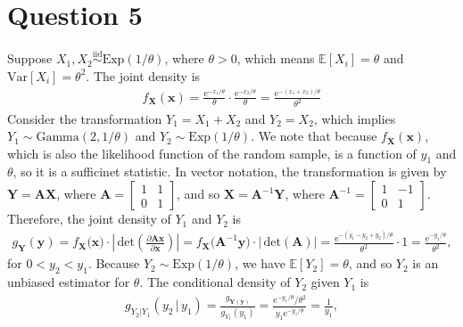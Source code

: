 \documentclass[10pt]{article}
\begin{document}
\section{Question 5} \noindent
Suppose \(X_1, X_2 \overset{\mathrm{iid}}{\sim} \mathrm{Exp}(1/\theta)\), where \(\theta > 0\), which means \(\mathbb{E}[X_i] = \theta\) and \(\mathrm{Var}[X_i] = \theta^2\). 
The joint density is 
\begin{align*}
    f_{\bm{X}}(\mathbf{x}) 
    = \frac{\mathrm{e}^{-x_1/\theta}}{\theta} \cdot \frac{\mathrm{e}^{-x_2/\theta}}{\theta}
    = \frac{\mathrm{e}^{-(x_1 + x_2)/\theta}}{\theta^2}
\end{align*}
Consider the transformation \(Y_1 = X_1 + X_2\) and \(Y_2 = X_2\), which implies \(Y_1 \sim \mathrm{Gamma}(2, 1/\theta)\) and \(Y_2 \sim \mathrm{Exp}(1/\theta)\).
We note that because \(f_{\bm{X}}(\mathbf{x})\), which is also the likelihood function of the random sample, is a function of \(y_1\) and \(\theta\), so it is
a sufficinet statistic. 
In vector notation, the transformation is given by \(\bm{Y} = \mathbf{A} \bm{X}\), where \(\mathbf{A} = \left[ \begin{smallmatrix}
    1 & 1 \\ 0 & 1
\end{smallmatrix} \right]\), and so \(\bm{X} = \mathbf{A}^{-1}\bm{Y}\), where \(\mathbf{A}^{-1} = \left[ \begin{smallmatrix}
    1 & -1 \\ 0 & 1
\end{smallmatrix} \right]\). Therefore, the joint density of \(Y_1\) and \(Y_2\) is 
\begin{align*}
    g_{\bm{Y}}(\mathbf{y}) 
    = f_{\bm{X}} \big( \mathbf{x} \big) \cdot \left| \,\mathrm{det} \left( \frac{\partial \mathbf{A} \mathbf{x}}{\partial \mathbf{x}} \right) \right|
    = f_{\bm{X}} \big( \mathbf{A}^{-1}\mathbf{y} \big) \cdot \left| \,\mathrm{det} \left( \mathbf{A} \right) \right|
    = \frac{\mathrm{e}^{-(y_1 - y_2 + y_2)/\theta}}{\theta^2} \cdot 1
    = \frac{\mathrm{e}^{-y_1/\theta}}{\theta^2},
\end{align*}
for \(0 < y_2 < y_1\). 
Because \(Y_2 \sim \mathrm{Exp}(1/\theta)\), we have \(\mathbb{E}[Y_2] = \theta\), and so \(Y_2\) is an unbiased estimator for \(\theta\). 
The conditional density of \(Y_2\) given \(Y_1\) is 
\begin{align*}
    g_{Y_2|Y_1}(y_2 \,|\, y_1)
    = \frac{g_{\bm{Y}(\mathbf{y})}}{g_{Y_1}(y_1)}
    = \frac{\mathrm{e}^{-y_1/\theta} / \theta^2}{y_1 \mathrm{e}^{-y_1/\theta}}
    = \frac{1}{y_1},
\end{align*}
\end{document}
